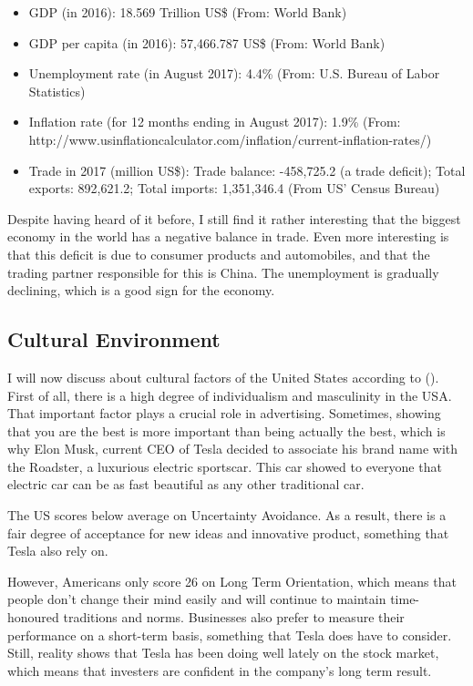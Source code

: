 \documentclass[12pt]{article}
\begin{document}
\begin{itemize}
	\item{GDP (in 2016): 18.569 Trillion US\$ (From: World Bank)}
	\item{GDP per capita (in 2016): 57,466.787 US\$ (From: World Bank)}
	\item{Unemployment rate (in August 2017): 4.4\% (From: U.S. Bureau of Labor Statistics)}
	\item{Inflation rate (for 12 months ending in August 2017): 1.9\% (From: http://www.usinflationcalculator.com/inflation/current-inflation-rates/)}
	\item{Trade in 2017 (million US\$): Trade balance: -458,725.2 (a trade deficit); Total exports: 892,621.2; Total imports: 1,351,346.4 (From US' Census Bureau)}
\end{itemize}

Despite having heard of it before, I still find it rather interesting that the biggest economy in the world has a negative balance in trade. Even more interesting is that this deficit is due to consumer products and automobiles, and that the trading partner responsible for this is China. The unemployment is gradually declining, which is a good sign for the economy.

\subsection{Cultural Environment}

I will now discuss about cultural factors of the United States according to (\cite{hoUS}). First of all, there is a high degree of individualism and masculinity in the USA. That important factor plays a crucial role in advertising. Sometimes, showing that you are the best is more important than being actually the best, which is why Elon Musk, current CEO of Tesla decided to associate his brand name with the Roadster, a luxurious electric sportscar. This car showed to everyone that electric car can be as fast beautiful as any other traditional car.

The US scores below average on Uncertainty Avoidance. As a result, there is a fair degree of acceptance for new ideas and innovative product, something that Tesla also rely on.

However, Americans only score 26 on Long Term Orientation, which means that people don't change their mind easily and will continue to maintain time-honoured traditions and norms. Businesses also prefer to measure their performance on a short-term basis, something that Tesla does have to consider. Still, reality shows that Tesla has been doing well lately on the stock market, which means that investers are confident in the company's long term result.
\end{document}
